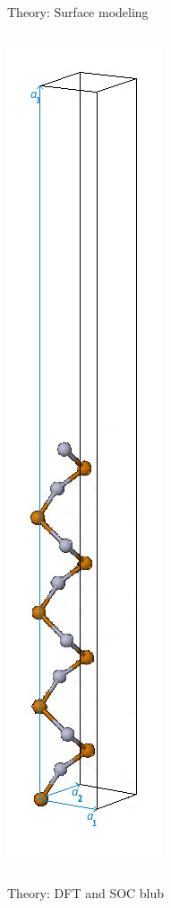\begin{frame}{Theory: Surface modeling}
\begin{columns}
\begin{column}
			\includegraphics[width=\linewidth]{andere_bilder/hgte_16layer_supercell_2.jpg} 
		\end{column} 
	\end{columns}
\end{frame}

\begin{frame}{Theory: DFT and SOC}
	blub
\end{frame}

